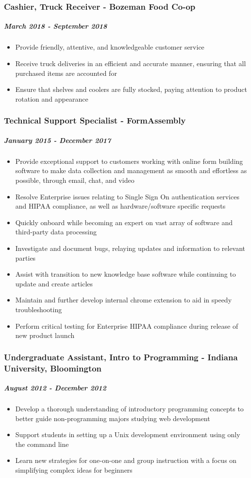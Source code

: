 \documentclass[11pt]{article}
\begin{document}
\subsubsection*{Cashier, Truck Receiver - Bozeman Food Co-op}
\label{sec:orgd7325bb}
\subparagraph*{\emph{March 2018 - September 2018}}
\label{sec:org3e3cd93}
\begin{itemize}
\item Provide friendly, attentive, and knowledgeable customer service
\item Receive truck deliveries in an efficient and accurate manner, ensuring that all purchased items are accounted for
\item Ensure that shelves and coolers are fully stocked, paying attention to product rotation and appearance
\end{itemize}
\subsubsection*{Technical Support Specialist - FormAssembly}
\label{sec:org930ad6e}
\subparagraph*{\emph{January 2015 - December 2017}}
\label{sec:org1b1175d}
\begin{itemize}
\item Provide exceptional support to customers working with online form
building software to make data collection and management as smooth
and effortless as possible, through email, chat, and video
\item Resolve Enterprise issues relating to Single Sign On authentication
services and HIPAA compliance, as well as hardware/software
specific requests
\item Quickly onboard while becoming an expert on vast array of software
and third-party data processing
\item Investigate and document bugs, relaying updates and information to
relevant parties
\item Assist with transition to new knowledge base software while
continuing to update and create articles
\item Maintain and further develop internal chrome extension to aid in
speedy troubleshooting
\item Perform critical testing for Enterprise HIPAA compliance during
release of new product launch
\end{itemize}
\subsubsection*{Undergraduate Assistant, Intro to Programming - Indiana University, Bloomington}
\label{sec:org305c314}
\subparagraph*{\emph{August 2012 - December 2012}}
\label{sec:orgaaf2328}
\begin{itemize}
\item Develop a thorough understanding of introductory programming concepts to better guide non-programming majors studying web development
\item Support students in setting up a Unix development environment using only the command line
\item Learn new strategies for one-on-one and group instruction with a focus on simplifying complex ideas for beginners
\end{itemize}
\end{document}
